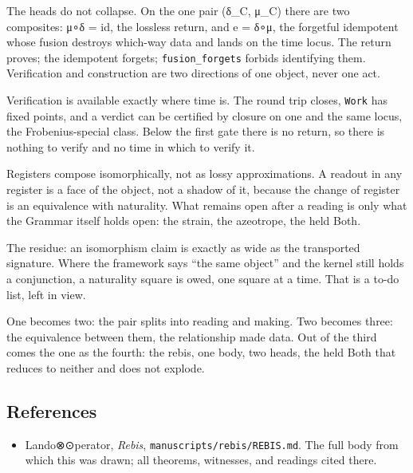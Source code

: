 \documentclass[12pt,a4paper]{article}
\begin{document}
The heads do not collapse. On the one pair (δ\_C, μ\_C) there are two
composites: μ∘δ = id, the lossless return, and e = δ∘μ, the forgetful
idempotent whose fusion destroys which-way data and lands on the time
locus. The return proves; the idempotent forgets;
\texttt{fusion\_forgets} forbids identifying them. Verification and
construction are two directions of one object, never one act.

Verification is available exactly where time is. The round trip closes,
\texttt{Work} has fixed points, and a verdict can be certified by
closure on one and the same locus, the Frobenius-special class. Below
the first gate there is no return, so there is nothing to verify and no
time in which to verify it.

Registers compose isomorphically, not as lossy approximations. A readout
in any register is a face of the object, not a shadow of it, because the
change of register is an equivalence with naturality. What remains open
after a reading is only what the Grammar itself holds open: the strain,
the azeotrope, the held Both.

The residue: an isomorphism claim is exactly as wide as the transported
signature. Where the framework says ``the same object'' and the kernel
still holds a conjunction, a naturality square is owed, one square at a
time. That is a to-do list, left in view.

One becomes two: the pair splits into reading and making. Two becomes
three: the equivalence between them, the relationship made data. Out of
the third comes the one as the fourth: the rebis, one body, two heads,
the held Both that reduces to neither and does not explode.

\hypertarget{references}{%
\subsection{References}\label{references}}

\begin{itemize}
\tightlist
\item
  Lando⊗⊙perator, \emph{Rebis}, \texttt{manuscripts/rebis/REBIS.md}. The
  full body from which this was drawn; all theorems, witnesses, and
  readings cited there.
\end{itemize}
\end{document}
